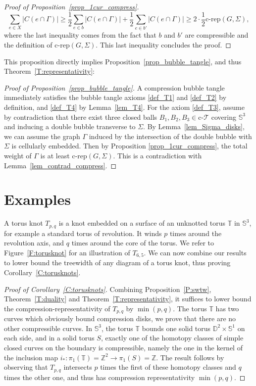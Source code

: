 \documentclass[11pt,a4paper]{article}
\newcommand{\To}{\mathds T}
\newcommand{\Sp}{\mathbb S}
\newcommand{\comprep}{\text{c-rep}}
\newcommand{\cT}{\text{c-}\mathcal{T}}
\begin{document}
\begin{proof}[Proof of Proposition~\ref{prop_1cur_compress}]
\begin{equation*}
\sum_{e \in X} |C(e \cap \Gamma)| \geq  \frac{1}{2} \sum_{e \in b} |C(e \cap \Gamma)| + \frac{1}{2} \sum_{e \in b'} |C(e \cap \Gamma)| \geq 2\cdot \frac{1}{2} \comprep(G,\Sigma),
\end{equation*}
where the last inequality comes from the fact that $b$ and $b'$ are compressible and the definition of $\comprep(G,\Sigma)$. This last inequality concludes the proof.
\end{proof}

This proposition directly implies Proposition~\ref{prop_bubble_tangle}, and thus Theorem~\ref{T:representativity}:

\begin{proof}[Proof of Proposition~\ref{prop_bubble_tangle}]
  A compression bubble tangle immediately satisfies the bubble tangle axioms \ref{def_T1} and \ref{def_T2} by definition, and \ref{def_T4} by Lemma~\ref{lem_T4}. For the axiom \ref{def_T3}, assume by contradiction that there exist three closed balls $B_1,B_2,B_3 \in \cT$ covering $\Sp^3$ and inducing a double bubble transverse to $\Sigma$. By Lemma~\ref{lem_Sigma_disks}, we can assume the graph $\Gamma$ induced by the intersection of the double bubble with $\Sigma$ is cellularly embedded. Then by Proposition \ref{prop_1cur_compress}, the total weight of $\Gamma$ is at least $\comprep(G,\Sigma)$. This is a contradiction with Lemma~\ref{lem_contrad_compress}.
\end{proof}

\section{Examples}\label{S:examples}

A torus knot $T_{p,q}$ is a knot embedded on a surface of an unknotted torus $\To$ in $\mathbb{S}^3$, for example a standard torus of revolution. It winds $p$ times around the revolution axis, and $q$ times around the core of the torus. We refer to Figure~\ref{F:torusknot} for an illustration of $T_{6,5}$. We can now combine our results to lower bound the treewidth of any diagram of a torus knot, thus proving Corollary~\ref{C:torusknots}.


\begin{proof}[Proof of Corollary~\ref{C:torusknots}]
Combining Proposition~\ref{P:swtw}, Theorem~\ref{T:duality} and Theorem~\ref{T:representativity}, it suffices to lower bound the compression-representativity of $T_{p,q}$ by $\min(p,q)$. The torus $\To$ has two curves which obviously bound compression disks, we prove that there are no other compressible curves. In $\mathbb{S}^3$, the torus $\To$ bounds one solid torus $\mathbb{D}^2 \times \mathbb{S}^1$ on each side, and in a solid torus $S$, exactly one of the homotopy classes of simple closed curves on the boundary is compressible, namely the one in the kernel of the inclusion map $i_*: \pi_1(\To)=\mathbb{Z}^2 \rightarrow \pi_1(S)=\mathbb{Z}$. The result follows by observing that $T_{p,q}$ intersects $p$ times the first of these homotopy classes and $q$ times the other one, and thus has compression representativity $\min(p,q)$.
\end{proof}
\end{document}
